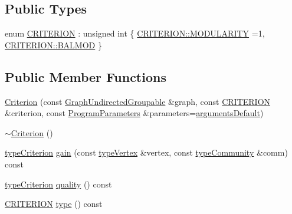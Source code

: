 \subsection*{Public Types}
\begin{DoxyCompactItemize}
\item 
enum \hyperlink{classCriterion_a55594c223ce0837b8319c46c66cb648f}{C\+R\+I\+T\+E\+R\+I\+ON} \+: unsigned int \{ \hyperlink{classCriterion_a55594c223ce0837b8319c46c66cb648fa2a7d416fbe43baf234420601ea73d946}{C\+R\+I\+T\+E\+R\+I\+O\+N\+::\+M\+O\+D\+U\+L\+A\+R\+I\+TY} =1, 
\hyperlink{classCriterion_a55594c223ce0837b8319c46c66cb648fa2ca6c7acaa036f0d3b18d83b688b2df9}{C\+R\+I\+T\+E\+R\+I\+O\+N\+::\+B\+A\+L\+M\+OD}
 \}
\end{DoxyCompactItemize}
\subsection*{Public Member Functions}
\begin{DoxyCompactItemize}
\item 
\hyperlink{classCriterion_ac880ed791be9ad5cf41fe8561bdec35f}{Criterion} (const \hyperlink{classGraphUndirectedGroupable}{Graph\+Undirected\+Groupable} \&graph, const \hyperlink{classCriterion_a55594c223ce0837b8319c46c66cb648f}{C\+R\+I\+T\+E\+R\+I\+ON} \&criterion, const \hyperlink{structProgramParameters}{Program\+Parameters} \&parameters=\hyperlink{program_8h_ae2d819404495f80f31db7676c1329d19}{arguments\+Default})
\item 
\hyperlink{classCriterion_ae66e2b8131ae4a5e7945d9fdc1b2dcc2}{$\sim$\+Criterion} ()
\item 
\hyperlink{criterionInterface_8h_af71ff22f6355fd69a4a62104bfd59a83}{type\+Criterion} \hyperlink{classCriterion_a99e23ddc517ca3f2ea4766a5b4be0e3e}{gain} (const \hyperlink{edge_8h_a5fbd20c46956d479cb10afc9855223f6}{type\+Vertex} \&vertex, const \hyperlink{graphUndirectedGroupable_8h_a914da95c9ea7f14f4b7f875c36818556}{type\+Community} \&comm) const
\item 
\hyperlink{criterionInterface_8h_af71ff22f6355fd69a4a62104bfd59a83}{type\+Criterion} \hyperlink{classCriterion_a1f8b3a7bf56b5434b04d5366d754d459}{quality} () const
\item 
\hyperlink{classCriterion_a55594c223ce0837b8319c46c66cb648f}{C\+R\+I\+T\+E\+R\+I\+ON} \hyperlink{classCriterion_a023f88034d2712af46160f1842388b0d}{type} () const
\end{DoxyCompactItemize}

